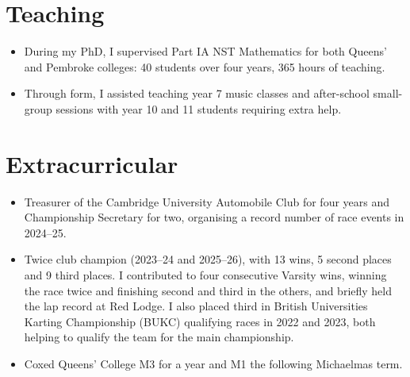 \documentclass[a4paper,11pt]{article}
\newcommand{\resumeItem}[1]{
  \item{
    {#1 \vspace{-2pt}}
  }
}
\newcommand{\resumeItemListStart}{\begin{itemize}\setlength\itemsep{1pt}}
\newcommand{\resumeItemListEnd}{\vspace{-5pt}\end{itemize}}
\begin{document}
\section{Teaching}
    \resumeItemListStart
    \resumeItem {
      During my PhD, I supervised Part IA NST Mathematics for both Queens' and Pembroke colleges: 40 students over four years, 365 hours of teaching.
    }
    \resumeItem
    {
      Through  form, I assisted teaching year 7 music classes and after-school small-group sessions with year 10 and 11 students requiring extra help.
    }
    \resumeItemListEnd

\section{Extracurricular}
    \resumeItemListStart
    \resumeItem {
      Treasurer of the Cambridge University Automobile Club for four years and Championship Secretary for two, organising a record number of race events in 2024--25.
    }
    \resumeItem {
      Twice club champion (2023--24 and 2025--26), with 13 wins, 5 second places and 9 third places.
      I contributed to four consecutive Varsity wins, winning the race twice and finishing second and third in the others, and briefly held the lap record at Red Lodge.
      I also placed third in British Universities Karting Championship (BUKC) qualifying races in 2022 and 2023, both helping to qualify the team for the main championship.
    }
    \resumeItem {
      Coxed Queens' College M3 for a year and M1 the following Michaelmas term.
    }
    \resumeItemListEnd

\end{document}
